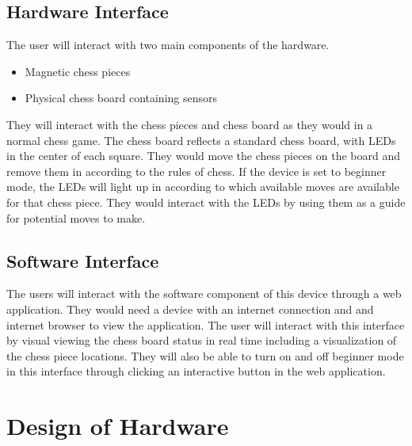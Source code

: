 \documentclass[12pt, titlepage]{article}
\begin{document}
\subsection{Hardware Interface}
The user will interact with two main components of the hardware.
\begin{itemize}
  \item Magnetic chess pieces
  \item Physical chess board containing sensors
\end{itemize}
They will interact with the chess pieces and chess board as they would in a normal chess game. The chess board reflects a standard chess board, with 
LEDs in the center of each square. They would move the chess pieces on the board and remove them in according to the rules of chess. If the device
is set to beginner mode, the LEDs will light up in according to which available moves are available for that chess piece. They would interact with the LEDs
by using them as a guide for potential moves to make.

\subsection{Software Interface}
The users will interact with the software component of this device through a web application. They would need a device with an internet connection and and internet browser
to view the application. The user will interact with this interface by visual viewing the chess board status in real time including a visualization of the chess piece locations.
They will also be able to turn on and off beginner mode in this interface through clicking an interactive button in the web application. 

\section{Design of Hardware}
\end{document}
